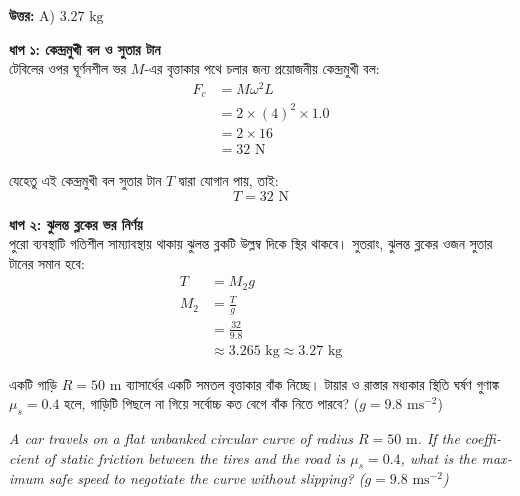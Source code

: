 \documentclass[12pt, a4paper]{article}
\begin{document}
\vspace{0.5em}
\begin{tcolorbox}[answerbox]
    \textbf{\color{success} উত্তর:} A)  $3.27\text{ kg}$
\end{tcolorbox}
\vspace{1em}

\begin{tcolorbox}[solutionbox={সমাধান (Solution)}]
    \noindent
    \textbf{ধাপ ১: কেন্দ্রমুখী বল ও সুতার টান} \\
    টেবিলের ওপর ঘূর্ণনশীল ভর $M$-এর বৃত্তাকার পথে চলার জন্য প্রয়োজনীয় কেন্দ্রমুখী বল:
    \begin{align*}
        F_c &= M \omega^2 L \\
        &= 2 \times (4)^2 \times 1.0 \\
        &= 2 \times 16 \\
        &= 32\text{ N}
    \end{align*}
    
    যেহেতু এই কেন্দ্রমুখী বল সুতার টান $T$ দ্বারা যোগান পায়, তাই:
    \[ T = 32\text{ N} \]
    
    \vspace{0.5em}
    \noindent\textbf{ধাপ ২: ঝুলন্ত ব্লকের ভর নির্ণয়} \\
    পুরো ব্যবস্থাটি গতিশীল সাম্যাবস্থায় থাকায় ঝুলন্ত ব্লকটি উল্লম্ব দিকে স্থির থাকবে। 
    সুতরাং, ঝুলন্ত ব্লকের ওজন সুতার টানের সমান হবে:
    \begin{align*}
        T &= M_2 g \\
        M_2 &= \frac{T}{g} \\
        &= \frac{32}{9.8} \\
        &\approx 3.265\text{ kg} \approx \mathbf{3.27}\text{ kg}
    \end{align*}
\end{tcolorbox}

\newpage

\begin{tcolorbox}[questionbox={প্রশ্ন (Question) 16}]
    \noindent
    একটি গাড়ি $R = 50\text{ m}$ ব্যাসার্ধের একটি সমতল বৃত্তাকার বাঁক নিচ্ছে। টায়ার ও রাস্তার মধ্যকার স্থিতি ঘর্ষণ গুণাঙ্ক $\mu_s = 0.4$ হলে, গাড়িটি পিছলে না গিয়ে সর্বোচ্চ কত বেগে বাঁক নিতে পারবে? ($g = 9.8\text{ ms}^{-2}$)
    
    \vspace{0.8em}
    \begin{english}
    \noindent\textit{\color{darkgray}
    A car travels on a flat unbanked circular curve of radius $R = 50\text{ m}$. If the coefficient of static friction between the tires and the road is $\mu_s = 0.4$, what is the maximum safe speed to negotiate the curve without slipping? ($g = 9.8\text{ ms}^{-2}$)
    }
    \end{english}
\end{tcolorbox}
\end{document}
